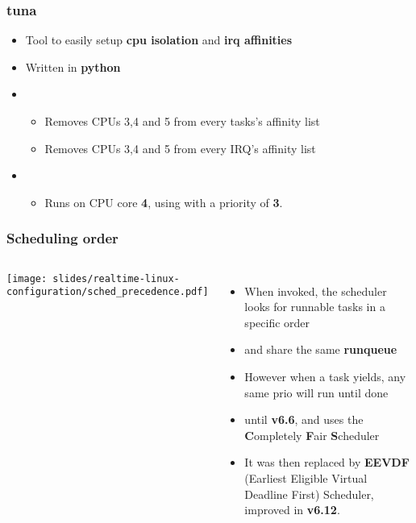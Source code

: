 \begin{frame}
	\frametitle{tuna}
	\begin{itemize}
		\item Tool to easily setup \textbf{cpu isolation} and \textbf{irq affinities}
		\item Written in \textbf{python}
		\item {}
			\begin{itemize}
				\item Removes CPUs 3,4 and 5 from every tasks's affinity list
				\item Removes CPUs 3,4 and 5 from every IRQ's affinity list
			\end{itemize}
		\item {}
			\begin{itemize}
				\item Runs  on CPU core \textbf{4}, using  with a priority of \textbf{3}.
			\end{itemize}
	\end{itemize}
\end{frame}



\begin{frame}
	\frametitle{Scheduling order}
	\begin{columns}
		\texttt{[image: slides/realtime-linux-configuration/sched\_precedence.pdf]}
		\begin{itemize}
			\item When invoked, the scheduler looks for runnable tasks in a specific order
			\item {} and  share the same \textbf{runqueue}
			\item However when a  task yields, any same prio  will run until done
			\item until \textbf{v6.6},  and  uses the \textbf{C}ompletely \textbf{F}air \textbf{S}cheduler
			\item It was then replaced by \textbf{EEVDF} (Earliest Eligible Virtual Deadline First) Scheduler, improved in \textbf{v6.12}.
		\end{itemize}
	\end{columns}
\end{frame}

